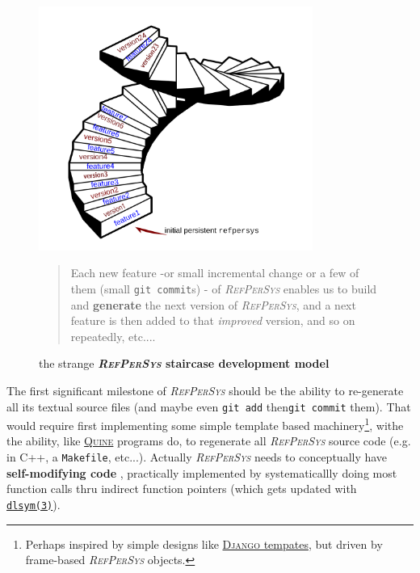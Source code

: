 \documentclass[11pt,a4paper,svgnames]{article}
\newcommand{\RefPerSys}{{\textit{\textsc{RefPerSys}}}}
\begin{document}
\begin{figure}[h]
  \begin{center}
    \includegraphics[width=0.8\textwidth]{spiral-stairs}
  \end{center}

  \begin{quote}
    \begin{relsize}{-0.2}
    Each new feature -or small incremental change or a few of them
    (small \texttt{git commit}s) - of {\RefPerSys} enables us to build
    and \textbf{generate} the next version of {\RefPerSys}, and a next
    feature is then added to that \textit{improved} version, and so on
    repeatedly, etc....
    \end{relsize}
  \end{quote}
  
  \caption{the strange \textbf{{\RefPerSys} staircase development model} {}}
  \label{fig:bootstrap-stair}
\end{figure}

The first significant milestone of {\RefPerSys} should be the ability
to re-generate all its textual source files (and maybe even
\texttt{git add} then\texttt{git commit} them). That would require
first implementing some simple template based
machinery\footnote{Perhaps inspired by simple designs like
  \href{https://docs.djangoproject.com/en/2.2/topics/templates/}{\textsc{Django}
    tempates}, but driven by frame-based {\RefPerSys} objects.}, withe
the ability, like
\href{https://en.wikipedia.org/wiki/Quine\_(computing)}{\textsc{Quine}}
programs do, to regenerate all {\RefPerSys} source code (e.g. in C++,
a \texttt{Makefile}, etc...). Actually {\RefPerSys} needs to
conceptually have \textbf{self-modifying code}
\cite{Tschudin:2005:HarnessingSC}, practically implemented by
systematicallly doing most function calls thru indirect function
pointers (which gets updated with
\href{http://man7.org/linux/man-pages/man3/dlsym.3.html}{\texttt{dlsym(3)}}).
\end{document}
